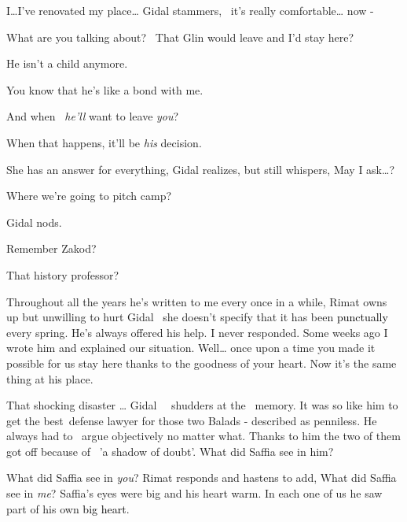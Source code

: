 \documentclass[letterpaper]{article}
\begin{document}
{\textquotedbl}I{\dots}I've renovated my place{\dots}{\textquotedbl} Gidal stammers,~{\textquotedbl} it's really
comfortable{\dots} now - {\textquotedbl} 

{\textquotedbl}What are you talking about? \ That Glin would leave and I'd stay here?{\textquotedbl} 

{\textquotedbl}He isn't a child anymore.{\textquotedbl} 

{\textquotedbl}You know that he's like a bond\textcolor{red}{ }with me.{\textquotedbl} 

{\textquotedbl}And when \textcolor{red}{\ }\textit{he'll} want to leave \textit{you}?{\textquotedbl} 

{\textquotedbl}When that happens, it'll be \textit{his} decision.{\textquotedbl} 

She has an answer for everything, Gidal realizes, but still whispers, {\textquotedbl}May I ask{\dots}?{\textquotedbl} 

{\textquotedbl}Where we're going to pitch camp?{\textquotedbl} 

Gidal nods. 

{\textquotedbl}Remember Zakod?{\textquotedbl} 

{\textquotedbl}That history professor?{\textquotedbl} 

{\textquotedbl}Throughout all the years he's written to me every once in a while,{\textquotedbl} Rimat owns up but
unwilling to hurt Gidal \ she doesn't specify that it has been\textcolor{red}{
}\textcolor{black}{punctually}\textcolor{red}{ }every spring. {\textquotedbl}He's always offered his help. I never
responded. Some weeks ago I wrote him and explained our situation. Well{\dots} once upon a time you made it possible
for us stay here thanks to\textcolor{red}{ }the goodness of your heart. Now it's the same thing at his
place.{\textquotedbl} 

{\textquotedbl}That shocking disaster {\dots}{\textquotedbl} Gidal\textcolor{red}{ \ \ }shudders at the
\textcolor{red}{\ }memory. {\textquotedbl}It was so like him to get the best~defense lawyer for those two Balads -
described as penniless. He always had to \ argue objectively no matter what. Thanks to him the two of them got off
because of \ {}'a shadow of doubt'. What did Saffia see in him?{\textquotedbl} 

{\textquotedbl}What did Saffia see in \textit{you}?{\textquotedbl} Rimat responds and hastens to add,
{\textquotedbl}What did Saffia see in \textit{me}? Saffia's eyes were big and his heart warm. In each one of us he saw
part of his own\textcolor{black}{ big heart}.
\end{document}
